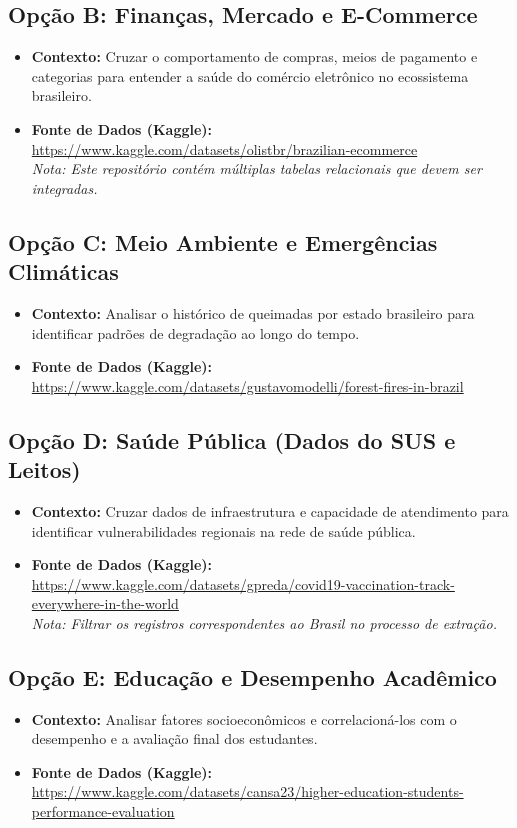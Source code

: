 \documentclass[12pt,a4paper]{article}
\begin{document}
	\subsection*{Opção B: Finanças, Mercado e E-Commerce}
	\begin{itemize}
		\item \textbf{Contexto:} Cruzar o comportamento de compras, meios de pagamento e categorias para entender a saúde do comércio eletrônico no ecossistema brasileiro.
		\item \textbf{Fonte de Dados (Kaggle):} \\
		\url{https://www.kaggle.com/datasets/olistbr/brazilian-ecommerce} \\
		\textit{Nota: Este repositório contém múltiplas tabelas relacionais que devem ser integradas.}
	\end{itemize}
	
	\subsection*{Opção C: Meio Ambiente e Emergências Climáticas}
	\begin{itemize}
		\item \textbf{Contexto:} Analisar o histórico de queimadas por estado brasileiro para identificar padrões de degradação ao longo do tempo.
		\item \textbf{Fonte de Dados (Kaggle):} \\
		\url{https://www.kaggle.com/datasets/gustavomodelli/forest-fires-in-brazil}
	\end{itemize}
	
	\subsection*{Opção D: Saúde Pública (Dados do SUS e Leitos)}
	\begin{itemize}
		\item \textbf{Contexto:} Cruzar dados de infraestrutura e capacidade de atendimento para identificar vulnerabilidades regionais na rede de saúde pública.
		\item \textbf{Fonte de Dados (Kaggle):} \\
		\url{https://www.kaggle.com/datasets/gpreda/covid19-vaccination-track-everywhere-in-the-world} \\
		\textit{Nota: Filtrar os registros correspondentes ao Brasil no processo de extração.}
	\end{itemize}
	
	\subsection*{Opção E: Educação e Desempenho Acadêmico}
	\begin{itemize}
		\item \textbf{Contexto:} Analisar fatores socioeconômicos e correlacioná-los com o desempenho e a avaliação final dos estudantes.
		\item \textbf{Fonte de Dados (Kaggle):} \\
		\url{https://www.kaggle.com/datasets/cansa23/higher-education-students-performance-evaluation}
	\end{itemize}
	
\end{document}
